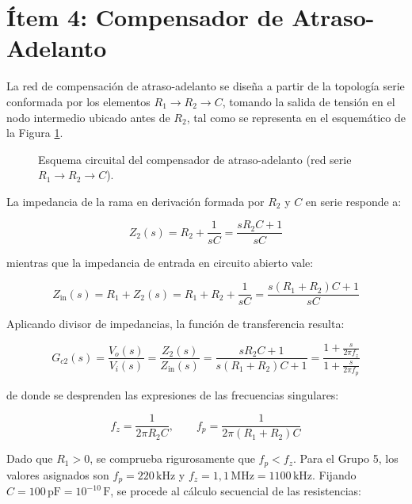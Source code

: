 \clearpage

\section{Ítem 4: Compensador de Atraso-Adelanto}

La red de compensación de atraso-adelanto se diseña a partir de la topología serie conformada por los elementos $R_1 \to R_2 \to C$,
tomando la salida de tensión en el nodo intermedio ubicado antes de $R_2$, tal como se representa en el esquemático de la
Figura \ref{crkt.ej2:atraso_adelanto}.

\begin{figure}[!ht]
    \centering
    
    \caption{Esquema circuital del compensador de atraso-adelanto (red serie $R_1 \to R_2 \to C$).}
    \label{crkt.ej2:atraso_adelanto}
\end{figure}

La impedancia de la rama en derivación formada por $R_2$ y $C$ en serie responde a:

\begin{equation}
    Z_2(s) = R_2 + \frac{1}{sC} = \frac{sR_2C + 1}{sC}
\end{equation}

mientras que la impedancia de entrada en circuito abierto vale:

\begin{equation}
    Z_{\text{in}}(s) = R_1 + Z_2(s) = R_1 + R_2 + \frac{1}{sC} = \frac{s(R_1 + R_2)C + 1}{sC}
\end{equation}

Aplicando divisor de impedancias, la función de transferencia resulta:

\begin{equation}
    G_{c2}(s) = \frac{V_o(s)}{V_i(s)} = \frac{Z_2(s)}{Z_{\text{in}}(s)} = \frac{sR_2C + 1}{s(R_1 + R_2)C + 1} = \frac{1 + \frac{s}{2\pi f_z}}{1 + \frac{s}{2\pi f_p}}
    \label{eq.ej2:fdt_atraso_adelanto_canonica}
\end{equation}

de donde se desprenden las expresiones de las frecuencias singulares:

\begin{equation}
    f_z = \frac{1}{2\pi R_2 C}, \qquad f_p = \frac{1}{2\pi (R_1 + R_2) C}
    \label{eq.ej2:fz_fp_expresiones}
\end{equation}

Dado que $R_1 > 0$, se comprueba rigurosamente que $f_p < f_z$. Para el Grupo 5, los valores asignados son $f_p = 220\,\si{\kilo\hertz}$
y $f_z = 1,1\,\si{\mega\hertz} = 1100\,\si{\kilo\hertz}$. Fijando $C = 100\,\si{\pico\farad} = 10^{-10}\,\si{\farad}$, se procede al
cálculo secuencial de las resistencias:

